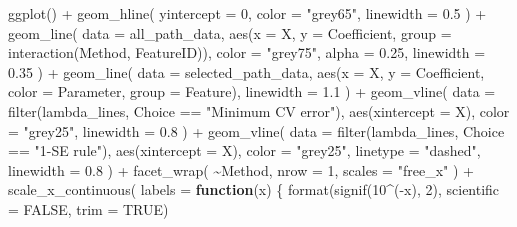 \documentclass[
  letterpaper,
  DIV=11,
  numbers=noendperiod]{scrreprt}
\newenvironment{Shaded}{\begin{snugshade}}{\end{snugshade}}
\newcommand{\AttributeTok}[1]{\textcolor[rgb]{0.40,0.45,0.13}{#1}}
\newcommand{\ConstantTok}[1]{\textcolor[rgb]{0.56,0.35,0.01}{#1}}
\newcommand{\ControlFlowTok}[1]{\textcolor[rgb]{0.00,0.23,0.31}{\textbf{#1}}}
\newcommand{\DecValTok}[1]{\textcolor[rgb]{0.68,0.00,0.00}{#1}}
\newcommand{\FloatTok}[1]{\textcolor[rgb]{0.68,0.00,0.00}{#1}}
\newcommand{\FunctionTok}[1]{\textcolor[rgb]{0.28,0.35,0.67}{#1}}
\newcommand{\NormalTok}[1]{\textcolor[rgb]{0.00,0.23,0.31}{#1}}
\newcommand{\SpecialCharTok}[1]{\textcolor[rgb]{0.37,0.37,0.37}{#1}}
\newcommand{\StringTok}[1]{\textcolor[rgb]{0.13,0.47,0.30}{#1}}
\begin{document}
\begin{Shaded}
\begin{Highlighting}[]
\FunctionTok{ggplot}\NormalTok{() }\SpecialCharTok{+}
  \FunctionTok{geom\_hline}\NormalTok{(}
    \AttributeTok{yintercept =} \DecValTok{0}\NormalTok{,}
    \AttributeTok{color =} \StringTok{"grey65"}\NormalTok{,}
    \AttributeTok{linewidth =} \FloatTok{0.5}
\NormalTok{  ) }\SpecialCharTok{+}
  \FunctionTok{geom\_line}\NormalTok{(}
    \AttributeTok{data =}\NormalTok{ all\_path\_data,}
    \FunctionTok{aes}\NormalTok{(}\AttributeTok{x =}\NormalTok{ X, }\AttributeTok{y =}\NormalTok{ Coefficient, }\AttributeTok{group =} \FunctionTok{interaction}\NormalTok{(Method, FeatureID)),}
    \AttributeTok{color =} \StringTok{"grey75"}\NormalTok{,}
    \AttributeTok{alpha =} \FloatTok{0.25}\NormalTok{,}
    \AttributeTok{linewidth =} \FloatTok{0.35}
\NormalTok{  ) }\SpecialCharTok{+}
  \FunctionTok{geom\_line}\NormalTok{(}
    \AttributeTok{data =}\NormalTok{ selected\_path\_data,}
    \FunctionTok{aes}\NormalTok{(}\AttributeTok{x =}\NormalTok{ X, }\AttributeTok{y =}\NormalTok{ Coefficient, }\AttributeTok{color =}\NormalTok{ Parameter, }\AttributeTok{group =}\NormalTok{ Feature),}
    \AttributeTok{linewidth =} \FloatTok{1.1}
\NormalTok{  ) }\SpecialCharTok{+}
  \FunctionTok{geom\_vline}\NormalTok{(}
    \AttributeTok{data =} \FunctionTok{filter}\NormalTok{(lambda\_lines, Choice }\SpecialCharTok{==} \StringTok{"Minimum CV error"}\NormalTok{),}
    \FunctionTok{aes}\NormalTok{(}\AttributeTok{xintercept =}\NormalTok{ X),}
    \AttributeTok{color =} \StringTok{"grey25"}\NormalTok{,}
    \AttributeTok{linewidth =} \FloatTok{0.8}
\NormalTok{  ) }\SpecialCharTok{+}
  \FunctionTok{geom\_vline}\NormalTok{(}
    \AttributeTok{data =} \FunctionTok{filter}\NormalTok{(lambda\_lines, Choice }\SpecialCharTok{==} \StringTok{"1{-}SE rule"}\NormalTok{),}
    \FunctionTok{aes}\NormalTok{(}\AttributeTok{xintercept =}\NormalTok{ X),}
    \AttributeTok{color =} \StringTok{"grey25"}\NormalTok{,}
    \AttributeTok{linetype =} \StringTok{"dashed"}\NormalTok{,}
    \AttributeTok{linewidth =} \FloatTok{0.8}
\NormalTok{  ) }\SpecialCharTok{+}
  \FunctionTok{facet\_wrap}\NormalTok{(}
    \SpecialCharTok{\textasciitilde{}}\NormalTok{Method,}
    \AttributeTok{nrow =} \DecValTok{1}\NormalTok{,}
    \AttributeTok{scales =} \StringTok{"free\_x"}
\NormalTok{  ) }\SpecialCharTok{+}
  \FunctionTok{scale\_x\_continuous}\NormalTok{(}
    \AttributeTok{labels =} \ControlFlowTok{function}\NormalTok{(x) \{}
      \FunctionTok{format}\NormalTok{(}\FunctionTok{signif}\NormalTok{(}\DecValTok{10}\SpecialCharTok{\^{}}\NormalTok{(}\SpecialCharTok{{-}}\NormalTok{x), }\DecValTok{2}\NormalTok{), }\AttributeTok{scientific =} \ConstantTok{FALSE}\NormalTok{, }\AttributeTok{trim =} \ConstantTok{TRUE}\NormalTok{)}

\end{Highlighting}
\end{Shaded}
\end{document}
